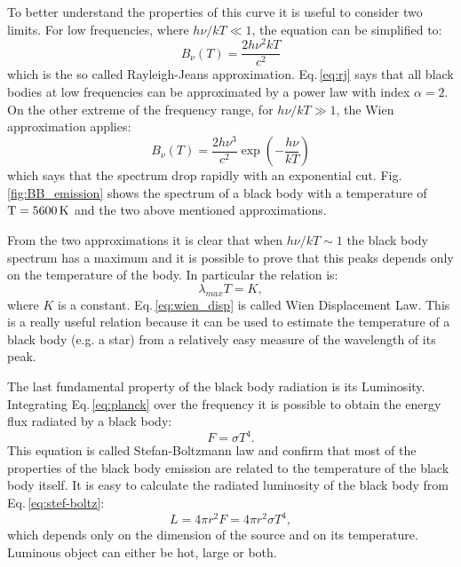 \documentclass[../thesis.tex]{subfiles}
\begin{document}
To better understand the properties of this curve it is useful to consider two limits.
For low frequencies, where $h\nu/kT \ll 1$, the equation can be simplified to:
\begin{equation}
    \label{eq:rj}
    B_{\nu}(T) = \frac{2h\nu^2kT}{c^2}
\end{equation}
which is the so called Rayleigh-Jeans approximation.
Eq.\,\ref{eq:rj} says that all black bodies at low frequencies can be approximated by a power law with index $\alpha = 2$.
On the other extreme of the frequency range, for $h\nu/kT \gg 1$, the Wien approximation applies:
\begin{equation}
    \label{eq:wien}
    B_{\nu}(T) = \frac{2h\nu^3}{c^2}\exp\left(-\frac{h\nu}{kT}\right)
\end{equation}
which says that the spectrum drop rapidly with an exponential cut.
Fig.\,\ref{fig:BB_emission} shows the spectrum of a black body with a temperature of $\rm T=5600\,\si{K}$ and the two above mentioned approximations.

From the two approximations it is clear that when $h\nu/kT \sim 1$ the black body spectrum has a maximum and it is possible to prove that this peaks depends only on the temperature of the body.
In particular the relation is:
\begin{equation}
    \label{eq:wien_disp}
    \lambda_{max}T=K,
\end{equation}
where $K$ is a constant.
Eq.\,\ref{eq:wien_disp} is called Wien Displacement Law.
This is a really useful relation because it can be used to estimate the temperature of a black body (e.g. a star) from a relatively easy measure of the wavelength of its peak.

The last fundamental property of the black body radiation is its Luminosity.
Integrating Eq.\,\ref{eq:planck} over the frequency it is possible to obtain the energy flux radiated by a black body:
\begin{equation}
    \label{eq:stef-boltz}
    F = \sigma T^4.
\end{equation}
This equation is called Stefan-Boltzmann law and confirm that most of the properties of the black body emission are related to the temperature of the black body itself.
It is easy to calculate the radiated luminosity of the black body from Eq.\,\ref{eq:stef-boltz}:
\begin{equation}
    \label{eq:luminosity}
    L = 4\pi r^2 F = 4\pi r^2\sigma T^4,
\end{equation}
which depends only on the dimension of the source and on its temperature.
Luminous object can either be hot, large or both.
\end{document}
